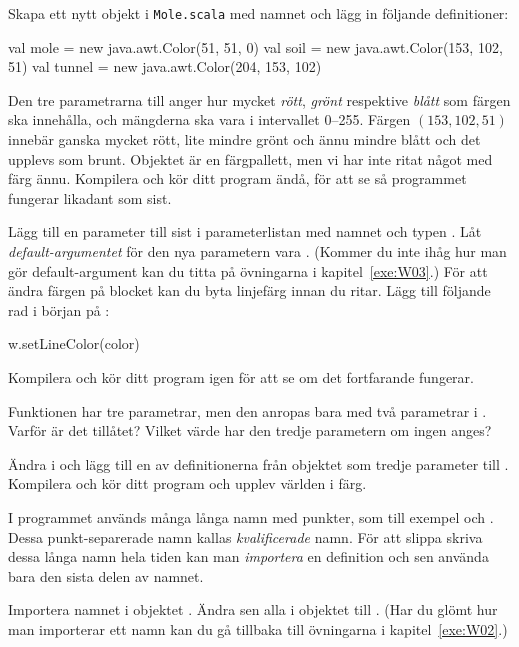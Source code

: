 \Subtask
Skapa ett nytt objekt i \texttt{Mole.scala} med namnet  och lägg in följande definitioner:
\begin{Code}
val mole = new java.awt.Color(51, 51, 0)
val soil = new java.awt.Color(153, 102, 51)
val tunnel = new java.awt.Color(204, 153, 102)
\end{Code}
Den tre parametrarna till  anger hur mycket \emph{rött}, \emph{grönt} respektive \emph{blått} som färgen ska innehålla, och mängderna ska vara i intervallet 0--255.
Färgen $(153, 102, 51)$ innebär ganska mycket rött, lite mindre grönt och ännu mindre blått och det upplevs som brunt.
Objektet  är en färgpallett, men vi har inte ritat något med färg ännu.
Kompilera och kör ditt program ändå, för att se så programmet fungerar likadant som sist.

\Subtask
Lägg till en parameter till  sist i parameterlistan med namnet  och typen .
Låt \emph{default-argumentet} för den nya parametern vara .
(Kommer du inte ihåg hur man gör default-argument kan du titta på övningarna i kapitel~\ref{exe:W03}.)
För att ändra färgen på blocket kan du byta linjefärg innan du ritar.
Lägg till följande rad i början på :
\begin{Code}
w.setLineColor(color)
\end{Code}
Kompilera och kör ditt program igen för att se om det fortfarande fungerar.

\Subtask\Pen
Funktionen  har tre parametrar, men den anropas bara med två parametrar i .
Varför är det tillåtet?
Vilket värde har den tredje parametern om ingen anges?

\Subtask
Ändra i  och lägg till en av definitionerna från objektet  som tredje parameter till .
Kompilera och kör ditt program och upplev världen i färg.

\Task
I programmet används många långa namn med punkter, som till exempel  och .
Dessa punkt-separerade namn kallas \emph{kvalificerade} namn.
För att slippa skriva dessa långa namn hela tiden kan man \emph{importera} en definition och sen använda bara den sista delen av namnet.

\Subtask
Importera namnet  i objektet . Ändra sen alla  i objektet till .
(Har du glömt hur man importerar ett namn kan du gå tillbaka till övningarna i kapitel~\ref{exe:W02}.)

